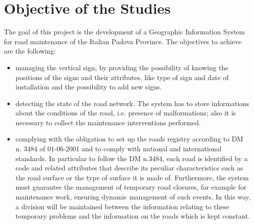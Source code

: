 \section{Objective of the Studies}
The goal of this project is the development of a Geographic Information System for road maintenance of the Italian Padova Province.
The objectives to achieve are the following:
\begin{itemize}
    \item managing the vertical sign, by providing the possibility of knowing the positions of the signs and their attributes, like type of sign and date of installation and the possibility to add new signs.
    \item detecting the state of the road network. The system has to store informations about the conditions of the road, i.e. presence of malformations; also it is necessary to collect the maintenance interventions  performed. 
    \item complying with the obligation to set up the roads registry according to DM n. 3484 of 01-06-2001 and to comply with national and international standards. In particular to follow the DM n.3484, each road is identified by a code and related attributes that describe its peculiar characteristics such as the road surface or the type of surface it is made of. Furthermore, the system must guarantee the management of temporary road closures, for example for maintenance work, ensuring dynamic management of such events. In this way, a division will be maintained between the information relating to these temporary problems and the information on the roads which is kept constant.
\end{itemize}